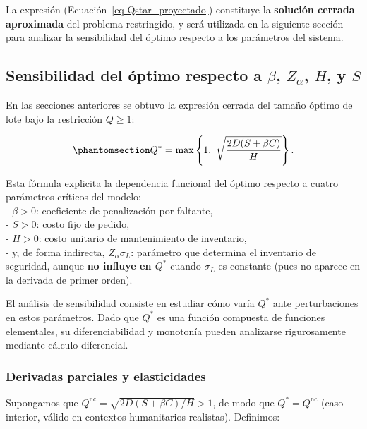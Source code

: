 \documentclass[
  spanish,
  us-letterpaper,
  DIV=11,
  numbers=noendperiod]{scrreprt}
\numberwithin{equation}{section}
\begin{document}
La expresión (Ecuación~\ref{eq-Qstar_proyectado}) constituye la
\textbf{solución cerrada aproximada} del problema restringido, y será
utilizada en la siguiente sección para analizar la sensibilidad del
óptimo respecto a los parámetros del sistema.

\subsection{\texorpdfstring{Sensibilidad del óptimo respecto a
\(\beta\), \(Z_\alpha\), \(H\), y
\(S\)}{Sensibilidad del óptimo respecto a \textbackslash beta, Z\_\textbackslash alpha, H, y S}}\label{sensibilidad-del-uxf3ptimo-respecto-a-beta-z_alpha-h-y-s}

En las secciones anteriores se obtuvo la expresión cerrada del tamaño
óptimo de lote bajo la restricción \(Q \geq 1\):

\begin{equation}\phantomsection\label{eq-Qstar_final}{
Q^* = \max\left\{ 1,\ \sqrt{\frac{2 D (S + \beta C)}{H}} \right\}.
}\end{equation}

Esta fórmula explicita la dependencia funcional del óptimo respecto a
cuatro parámetros críticos del modelo:\\
- \(\beta > 0\): coeficiente de penalización por faltante,\\
- \(S > 0\): costo fijo de pedido,\\
- \(H > 0\): costo unitario de mantenimiento de inventario,\\
- y, de forma indirecta, \(Z_\alpha \sigma_L\): parámetro que determina
el inventario de seguridad, aunque \textbf{no influye en \(Q^*\)} cuando
\(\sigma_L\) es constante (pues no aparece en la derivada de primer
orden).

El análisis de sensibilidad consiste en estudiar cómo varía \(Q^*\) ante
perturbaciones en estos parámetros. Dado que \(Q^*\) es una función
compuesta de funciones elementales, su diferenciabilidad y monotonía
pueden analizarse rigurosamente mediante cálculo diferencial.

\subsubsection{Derivadas parciales y
elasticidades}\label{derivadas-parciales-y-elasticidades}

Supongamos que \(Q^{\text{nc}} = \sqrt{2 D (S + \beta C)/H} > 1\), de
modo que \(Q^* = Q^{\text{nc}}\) (caso interior, válido en contextos
humanitarios realistas). Definimos:
\end{document}
